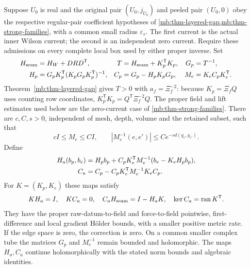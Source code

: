 \documentclass[11pt,letterpaper,reqno]{amsart}
\makeatletter
\numberwithin{equation}{section}
\theoremstyle{definition}
\newcommand{\ms@minorstart}{%
  \pushQED{\qed}\renewcommand{\qedsymbol}{$\blacksquare$}}
\newenvironment{proposition}[1][]{\ms@minorstart\ms@proposition[#1]}
  {\popQED\endms@proposition}
\theoremstyle{remark}
\makeatother
\begin{document}
\begin{proposition}[Uniform edge Schur correction]\label{mb:edge-schur}
Suppose $U_0$ is real and the original pair $(U_0,j_{U_0})$
and peeled pair $(U_0,0)$ obey the respective regular-pair
coefficient hypotheses of \cref{mb:thm-layered-gap,mb:thm-strong-families}, with a common small
radius $\varepsilon_s$. The first current is the actual inner Wilson
current; the second is an independent zero current. Require
these admissions on every complete local box used by either
proper inverse. Set
\begin{align*}
 H_{\rm seam}&=H_W+DRD^{\mathsf T},&
 T&=H_{\rm seam}+K_p^{\mathsf T}K_p,& G_p&=T^{-1},\\
 H_p&=G_pK_p^{\mathsf T}(K_pG_pK_p^{\mathsf T})^{-1},&
 C_p&=G_p-H_pK_pG_p,& M_e&=K_eC_pK_e^{\mathsf T}.
\end{align*}
Theorem~\ref{mb:thm-layered-gap} gives $T>0$ with
$a_f=\Xi_f^{-2}$: because $K_p=\Xi_fQ$ uses counting row
coordinates, $K_p^{\mathsf T}K_p=Q^{\mathsf T}\Xi_f^{-2}Q$.
The proper field and lift estimates used below are the
zero-current case of \cref{mb:thm-strong-families}. There are $c,C,s>0$, independent of mesh, depth,
volume and the retained subset, such that
\begin{equation}\label{mb:edge-gram-gap}
 cI\le M_e\le CI,\qquad
             |M_e^{-1}(e,e')|\le Ce^{-s d(y_e,y_{e'})}.
\end{equation}
Define
\begin{align}
 H_a(b_p,b_e)&=H_pb_p+C_pK_e^{\mathsf T}M_e^{-1}
                         (b_e-K_eH_pb_p),\notag\\
 C_a&=C_p-C_pK_e^{\mathsf T}M_e^{-1}K_eC_p.
                                           \label{mb:edge-correction}
\end{align}
For $K=(K_p,K_e)$ these maps satisfy
\begin{equation}\label{mb:edge-identities}
 KH_a=I,\quad KC_a=0,\quad C_aH_{\rm seam}=I-H_aK,
                     \quad\ker C_a=\operatorname{ran}K^{\mathsf T}.
\end{equation}
They have the proper raw-datum-to-field and force-to-field
pointwise, first-difference and local gradient H\"older bounds,
with a smaller positive metric rate. If the edge space is zero,
the correction is zero. On a common smaller complex tube the
matrices $G_p$ and $M_e^{-1}$ remain bounded and holomorphic.
The maps $H_a,C_a$ continue holomorphically with the stated
norm bounds and algebraic identities.
\end{proposition}
\end{document}
